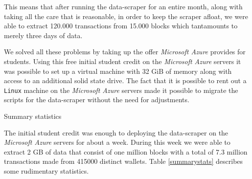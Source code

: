 This means that after running the data-scraper for an entire month, along with taking all the care that is reasonable, in order to keep the scraper afloat, we were able to extract 120.000 transactions from 15.000 blocks which tantamounts to merely three days of data.

We solved all these problems by taking up the offer \emph{Microsoft Azure} provides for students. Using this free initial student credit on the \emph{Microsoft Azure} servers it was possible to set up a virtual machine with 32 GiB of memory along with access to an additional solid state drive. The fact that it is possible to rent out a \texttt{Linux} machine on the \emph{Microsoft Azure} servers made it possible to migrate the scripts for the data-scraper without the need for adjustments.

\begin{table}[h]
\centering
\caption{Summary statistics}

\label{summarystats}
\end{table}

The initial student credit was enough to deploying the data-scraper on the \emph{Microsoft Azure} servers for about a week. During this week we were able to extract 2 GB of data that consist of one million blocks with a total of 7.3 million transactions made from 415000 distinct wallets. Table \ref{summarystats} describes some rudimentary statistics.
